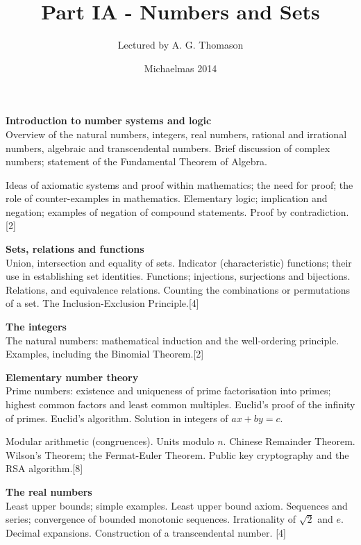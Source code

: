 \documentclass[a4paper]{article}
\title{Part IA - Numbers and Sets}
\author{Lectured by A. G. Thomason}
\date{Michaelmas 2014}
\begin{document}
\maketitle
{\small
  \noindent\textbf{Introduction to number systems and logic}\\
  Overview of the natural numbers, integers, real numbers, rational and irrational numbers, algebraic and transcendental numbers. Brief discussion of complex numbers; statement of the Fundamental Theorem of Algebra.

  \vspace{5pt}
  \noindent Ideas of axiomatic systems and proof within mathematics; the need for proof; the role of counter-examples in mathematics. Elementary logic; implication and negation; examples of negation of compound statements. Proof by contradiction.\hspace*{\fill}[2]

  \vspace{10pt}
  \noindent\textbf{Sets, relations and functions}\\
  Union, intersection and equality of sets. Indicator (characteristic) functions; their use in establishing set identities. Functions; injections, surjections and bijections. Relations, and equivalence relations. Counting the combinations or permutations of a set. The Inclusion-Exclusion Principle.\hspace*{\fill}[4]

  \vspace{10pt}
  \noindent\textbf{The integers}\\
  The natural numbers: mathematical induction and the well-ordering principle. Examples, including the Binomial Theorem.\hspace*{\fill}[2]

  \vspace{10pt}
  \noindent\textbf{Elementary number theory}\\
  Prime numbers: existence and uniqueness of prime factorisation into primes; highest common factors and least common multiples. Euclid’s proof of the infinity of primes. Euclid’s algorithm. Solution in integers of $ax+by = c$.

  \vspace{5pt}
  \noindent Modular arithmetic (congruences). Units modulo $n$. Chinese Remainder Theorem. Wilson's Theorem; the Fermat-Euler Theorem. Public key cryptography and the RSA algorithm.\hspace*{\fill}[8]

  \vspace{10pt}
  \noindent\textbf{The real numbers}\\
  Least upper bounds; simple examples. Least upper bound axiom. Sequences and series; convergence of bounded monotonic sequences. Irrationality of $\sqrt{2}$ and $e$. Decimal expansions. Construction of a transcendental number.\hspace*{\fill} [4]

}
\end{document}
